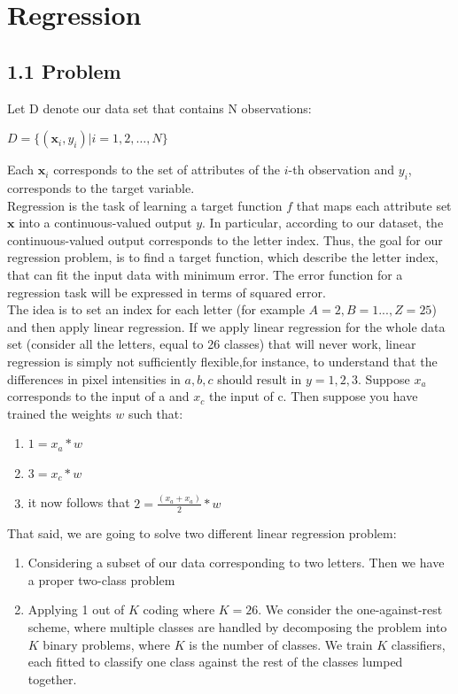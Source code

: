 \chapter*{Regression}
\setcounter{chapter}{1}
\section*{1.1 Problem}
\setcounter{section}{1}
Let D denote our data set that contains N observations:
\begin{center}
$D = \{( \textbf{x}_i ,y_i ) | i = 1, 2, \dots, N\}$
\end{center}
Each $\textbf{x}_i $ corresponds to the set of attributes of the $i$-th observation and $y_i$, corresponds to the target variable. \\

Regression is the task of learning a target function $f$ that maps each attribute set $\textbf{x}$ into a continuous-valued output $y$. In particular, according to our dataset, the continuous-valued output corresponds to the letter index. 
Thus, the goal for our  regression problem, is to find a target function, which describe the letter index, that can fit the input data with minimum error. The error function for a regression task will be expressed in terms of squared error.\\

The idea is to set an index for each letter (for example $A=2, B=1 ... , Z = 25$) and then apply linear regression. 
If we apply linear regression for the whole data set (consider all the letters, equal to 26 classes) that will never work, linear regression is simply not sufficiently flexible,for instance, to understand that the differences in pixel intensities in $a, b, c$ should result in $y = 1, 2, 3$. Suppose $x_a$ corresponds to the input of a and $x_c$ the input of c. Then suppose you have trained the weights $w$ such that:
\begin{enumerate}
\item []$1 = x_a * w$
\item []$3 = x_c * w$
\item []it now follows that $2 = \frac{(x_a + x_a)}{2}* w$\\
\end{enumerate}

That said, we are going to solve two different linear regression problem:
\begin{enumerate}
\item Considering a subset of our data corresponding to two letters. Then we have a proper two-class problem
\item Applying 1 out of $K$ coding where $K=26$. We consider the one-against-rest scheme, where multiple classes are handled by decomposing the problem into $K$ binary problems, where $K$ is the number of classes. We train $K$ classifiers, each fitted to classify one class against the rest of the classes lumped together.
\end {enumerate}

